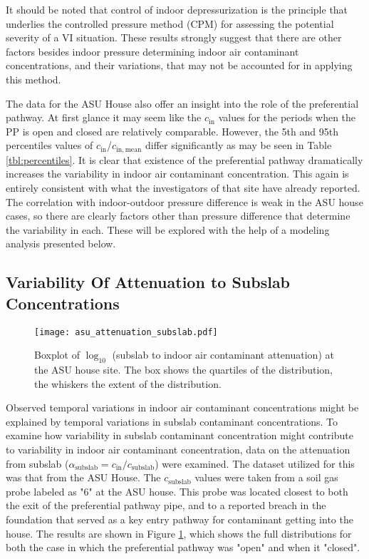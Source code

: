 \documentclass[journal=esthag,manuscript=article]{achemso}
\begin{document}
It should be noted that control of indoor depressurization is the principle that underlies the controlled pressure method (CPM) for assessing the potential severity of a VI situation.
These results strongly suggest that there are other factors besides indoor pressure determining indoor air contaminant concentrations, and their variations, that may not be accounted for in applying this method.\par

The data for the ASU House also offer an insight into the role of the preferential pathway.
At first glance it may seem like the $c_\mathrm{in}$ values for the periods when the PP is open and closed are relatively comparable.
However, the 5th and 95th percentiles values of $c_\mathrm{in}$/$c_\mathrm{in,mean}$ differ significantly as may be seen in Table \ref{tbl:percentiles}.
It is clear that existence of the preferential pathway dramatically increases the variability in indoor air contaminant concentration.
This again is entirely consistent with what the investigators of that site have already reported\cite{guo_identification_2015}.
The correlation with indoor-outdoor pressure difference is weak in the ASU house cases, so there are clearly factors other than pressure difference that determine the variability in each.
These will be explored with the help of a modeling analysis presented below.\par

\subsection{Variability Of Attenuation to Subslab Concentrations}

\begin{figure}[htb!]
 \caption{Boxplot of $\log_{10}$ (subslab to indoor air contaminant attenuation) at the ASU house site. The box shows the quartiles of the distribution, the whiskers the extent of the distribution.}\label{fig:attenuation_subslab}
 \texttt{[image: asu\_attenuation\_subslab.pdf]}
\end{figure}

Observed temporal variations in indoor air contaminant concentrations might be explained by temporal variations in subslab contaminant concentrations.
To examine how variability in subslab contaminant concentration might contribute to variability in indoor air contaminant concentration, data on the attenuation from subslab ($\alpha_\mathrm{subslab} = c_\mathrm{in}/c_\mathrm{subslab}$) were examined.
The dataset utilized for this was that from the ASU House.
The $c_\mathrm{subslab}$ values were taken from a soil gas probe labeled as "6" at the ASU house.
This probe was located closest to both the exit of the preferential pathway pipe, and to a reported breach in the foundation that served as a key entry pathway for contaminant getting into the house\cite{guo_identification_2015}.
The results are shown in Figure \ref{fig:attenuation_subslab}, which shows the full distributions for both the case in which the preferential pathway was "open" and when it "closed".\par
\end{document}
